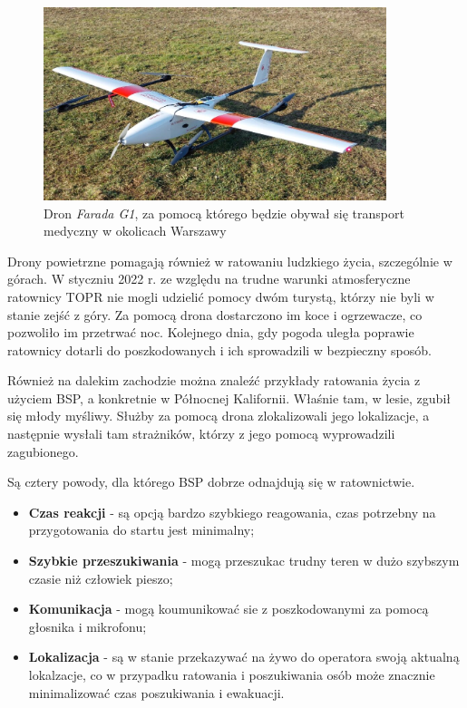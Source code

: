 \begin{figure}[!h]
  \centering
  \includegraphics[width=10cm]{./Obrazy/Farada_G1.jpg}
  \caption{Dron \textit{Farada G1}, za pomocą którego będzie obywał się transport medyczny w okolicach Warszawy}
  \end{figure}

Drony powietrzne pomagają również w ratowaniu ludzkiego życia, szczególnie w górach. W styczniu 2022 r. ze względu na trudne warunki atmosferyczne ratownicy TOPR nie mogli udzielić pomocy dwóm turystą, którzy nie byli w stanie zejść z góry. Za pomocą drona dostarczono im koce i ogrzewacze, co pozwoliło im przetrwać noc. Kolejnego dnia, gdy pogoda uległa poprawie ratownicy dotarli do poszkodowanych i ich sprowadzili w bezpieczny sposób.\cite{topr-dron}

Również na dalekim zachodzie można znaleźć przykłady ratowania życia z użyciem BSP, a konkretnie w Północnej Kalifornii. Właśnie tam, w lesie, zgubił się młody myśliwy. Służby za pomocą drona zlokalizowali jego lokalizacje, a następnie wysłali tam strażników, którzy z jego pomocą wyprowadzili zagubionego.\cite{bbc-drone-rescue} 

Są cztery powody, dla którego BSP dobrze odnajdują się w ratownictwie.
\begin{itemize}
  \item \textbf{Czas reakcji} - są opcją bardzo szybkiego reagowania, czas potrzebny na przygotowania do startu jest minimalny;
  \item \textbf{Szybkie przeszukiwania} - mogą przeszukac trudny teren w dużo szybszym czasie niż człowiek pieszo;
  \item \textbf{Komunikacja} - mogą koumunikować sie z poszkodowanymi za pomocą głosnika i mikrofonu;
  \item \textbf{Lokalizacja} - są w stanie przekazywać na żywo do operatora swoją aktualną lokalzacje, co w przypadku ratowania i poszukiwania osób może znacznie minimalizować czas poszukiwania i ewakuacji. \cite{snowbrains-drone}
\end{itemize}

